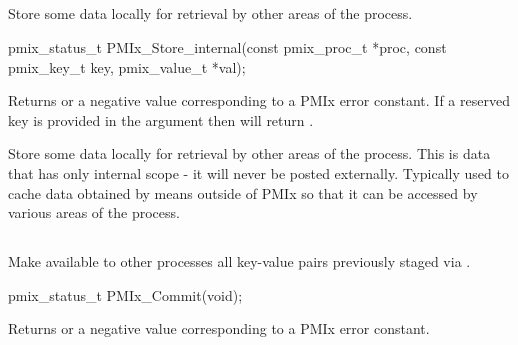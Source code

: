 \subsection{}

\summary

Store some data locally for retrieval by other areas of the process.

\format

\cspecificstart
\begin{codepar}
pmix_status_t
PMIx_Store_internal(const pmix_proc_t *proc,
                    const pmix_key_t key,
                    pmix_value_t *val);
\end{codepar}
\cspecificend

\begin{arglist}
\end{arglist}

Returns  or a negative value corresponding to a PMIx error constant.
If a reserved key is provided in the  argument then  will return .

\descr

Store some data locally for retrieval by other areas of the process.
This is data that has only internal scope - it will never be posted externally. Typically used to cache data obtained by means outside of \ac{PMIx} so that it can be accessed by various areas of the process.


\subsection{}

\summary

Make available to other processes all key-value pairs previously staged via .

\format

\cspecificstart
\begin{codepar}
pmix_status_t PMIx_Commit(void);
\end{codepar}
\cspecificend

Returns  or a negative value corresponding to a PMIx error constant.

